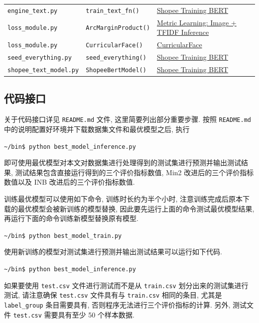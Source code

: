 \documentclass[12pt]{article}
\begin{document}
\begin{table}[htbp]
\begin{tabular}{lll}
    \verb|engine_text.py| & \verb|train_text_fn()| & \href{https://www.kaggle.com/shigemitsutomizawa/shopee-training-bert-11th-place-simple-solution}{Shopee Training BERT} \\
    \verb|loss_module.py| & \verb|ArcMarginProduct()| & \href{https://www.kaggle.com/tanulsingh077/metric-learning-image-tfidf-inference}{Metric Learning: Image + TFIDF Inference} \\
    \verb|loss_module.py| & \verb|CurricularFace()| & \href{https://github.com/HuangYG123/CurricularFace/blob/8b2f47318117995aa05490c05b455b113489917e/head/metrics.py#L70}{CurricularFace} \\
    \verb|seed_everything.py| & \verb|seed_everything()| & \href{https://www.kaggle.com/shigemitsutomizawa/shopee-training-bert-11th-place-simple-solution}{Shopee Training BERT} \\
    \verb|shopee_text_model.py| & \verb|ShopeeBertModel()| & \href{https://www.kaggle.com/shigemitsutomizawa/shopee-training-bert-11th-place-simple-solution}{Shopee Training BERT} \\
    \bottomrule
  \end{tabular}
\end{table}

\subsection{代码接口}

关于代码接口详见 \verb|README.md| 文件, 这里简要列出部分重要步骤. 按照 \verb|README.md| 中的说明配置好环境并下载数据集文件和最优模型之后, 执行

\verb|~/bin$ python best_model_inference.py|

即可使用最优模型对本文对数据集进行处理得到的测试集进行预测并输出测试结果, 测试结果包含直接运行得到的三个评价指标数值, Min2 改进后的三个评价指标数值以及 INB 改进后的三个评价指标数值.

训练最优模型可以使用如下命令, 训练时长约为半个小时, 注意训练完成后原本下载的最优模型会被新训练的模型替换, 因此要先运行上面的命令测试最优模型结果, 再运行下面的命令训练新模型替换原有模型.

\verb|~/bin$ python best_model_train.py|

使用新训练的模型对测试集进行预测并输出测试结果可以运行如下代码.

\verb|~/bin$ python best_model_inference.py|

如果要使用 \verb|test.csv| 文件进行测试而不是从 \verb|train.csv| 划分出来的测试集进行测试, 请注意确保 \verb|test.csv| 文件具有与 \verb|train.csv| 相同的条目, 尤其是 \verb|label_group| 条目需要具有, 否则程序无法进行三个评价指标的计算. 另外, 测试文件 \verb|test.csv| 需要具有至少 50 个样本数据.
\end{document}
